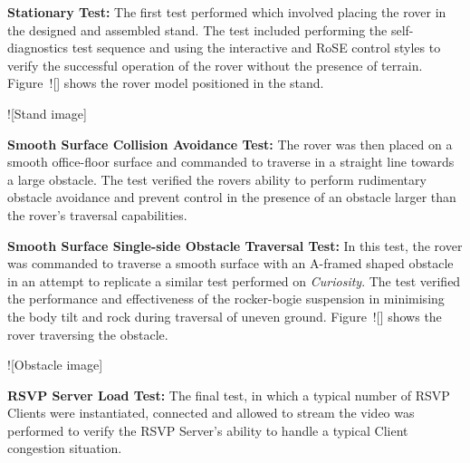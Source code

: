     \begin{TEST}
      \item\label{test:stationaryTest} \textbf{Stationary Test:} The first test performed which involved placing the rover in the designed and assembled stand. The test included performing the self-diagnostics test sequence and using the interactive and RoSE control styles to verify the successful operation of the rover without the presence of terrain. Figure~![] shows the rover model positioned in the stand.
      
      ![Stand image]
      
      \item\label{test:collisionTest} \textbf{Smooth Surface Collision Avoidance Test:} The rover was then placed on a smooth office-floor surface and commanded to traverse in a straight line towards a large obstacle. The test verified the rovers ability to perform rudimentary obstacle avoidance and prevent control in the presence of an obstacle larger than the rover's traversal capabilities.
      
      \item\label{test:obstacleTest} \textbf{Smooth Surface Single-side Obstacle Traversal Test:} In this test, the rover was commanded to traverse a smooth surface with an A-framed shaped obstacle in an attempt to replicate a similar test performed on \textit{Curiosity}. The test verified the performance and effectiveness of the rocker-bogie suspension in minimising the body tilt and rock during traversal of uneven ground. Figure~![] shows the rover traversing the obstacle.
      
      ![Obstacle image]
      
      \item\label{test:serverLoadTest} \textbf{RSVP Server Load Test:} The final test, in which a typical number of RSVP Clients were instantiated, connected and allowed to stream the video was performed to verify the RSVP Server's ability to handle a typical Client congestion situation.
    
    \end{TEST}